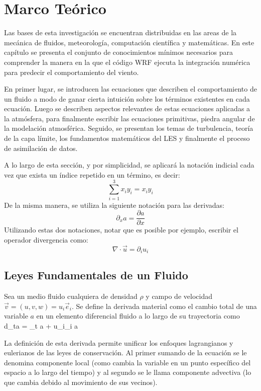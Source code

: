 \chapter{Marco Teórico}
Las bases de esta investigación se encuentran distribuidas en las areas de la mecánica de fluidos, meteorología, computación científica y matemáticas. En este capítulo se presenta el conjunto de conocimientos mínimos necesarios para comprender la manera en la que el código WRF ejecuta la integración numérica para predecir el comportamiento del viento. 

En primer lugar, se introducen las ecuaciones que describen el comportamiento de un fluido a modo de ganar cierta intuición sobre los términos existentes en cada ecuación. Luego se describen aspectos relevantes de estas ecuaciones aplicadas a la atmósfera, para finalmente escribir las ecuaciones primitivas, piedra angular de la modelación atmosférica. Seguido, se presentan los temas de turbulencia, teoría de la capa límite, los fundamentos matemáticos del LES y finalmente el proceso de asimilación de datos.

A lo largo de esta sección, y por simplicidad, se aplicará la notación indicial cada vez que exista un índice repetido en un término, es decir:
\begin{equation}\label{eq:indicial}
\sum_{i=1}^{3}\! x_i y_i = x_i y_i
\end{equation}
De la misma manera, se utiliza la siguiente notación para las derivadas:
\begin{equation}
\partial_x a = \frac{\partial a}{\partial x}
\end{equation}
Utilizando estas dos notaciones, notar que es posible por ejemplo, escribir el operador divergencia como:
\begin{equation}\label{eq:divergencia}
\nabla\cdot\vec{u} = \partial_i u_i
\end{equation}
\section{Leyes Fundamentales de un Fluido}
Sea un medio fluido cualquiera de densidad $\rho$ y campo de velocidad $\vec{v}=(u,v,w)=u_i\vec{e}_i$. Se define la derivada material como el cambio total de una variable $a$ en un elemento diferencial fluido a lo largo de su trayectoria como
\be 
d_ta = \partial_t a + u_i\partial_i a
\ee

La definición de esta derivada permite unificar los enfoques lagrangianos y eulerianos de las leyes de conservación. Al primer sumando de la ecuación se le denomina componente local (como cambia la variable en un punto específico del espacio a lo largo del tiempo) y al segundo se le llama componente advectiva (lo que cambia debido al movimiento de sus vecinos).
